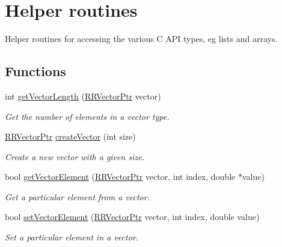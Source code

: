 \hypertarget{group__helper_routines}{\section{Helper routines}
\label{group__helper_routines}
}


Helper routines for accessing the various C A\+P\+I types, eg lists and arrays.  


\subsection*{Functions}
\begin{DoxyCompactItemize}
\item 
int \hyperlink{group__helper_routines_ga36649ac03ad15ad8242f03ff9d28b0a9}{get\+Vector\+Length} (\hyperlink{rrc__types_8h_a3be72d6006034fd349f753d2bf441bf7}{R\+R\+Vector\+Ptr} vector)
\begin{DoxyCompactList}\small\item\em Get the number of elements in a vector type. \end{DoxyCompactList}\item 
\hyperlink{rrc__types_8h_a3be72d6006034fd349f753d2bf441bf7}{R\+R\+Vector\+Ptr} \hyperlink{group__helper_routines_gac903628f96b1bf2308fa4a79b189cc1c}{create\+Vector} (int size)
\begin{DoxyCompactList}\small\item\em Create a new vector with a given size. \end{DoxyCompactList}\item 
bool \hyperlink{group__helper_routines_ga10140bb46cc906a75e575c81022a9f2a}{get\+Vector\+Element} (\hyperlink{rrc__types_8h_a3be72d6006034fd349f753d2bf441bf7}{R\+R\+Vector\+Ptr} vector, int index, double $\ast$value)
\begin{DoxyCompactList}\small\item\em Get a particular element from a vector. \end{DoxyCompactList}\item 
bool \hyperlink{group__helper_routines_gaca70bc807a455ec497b7d8e8a2affe45}{set\+Vector\+Element} (\hyperlink{rrc__types_8h_a3be72d6006034fd349f753d2bf441bf7}{R\+R\+Vector\+Ptr} vector, int index, double value)
\begin{DoxyCompactList}\small\item\em Set a particular element in a vector. \end{DoxyCompactList}\item 

\end{DoxyCompactItemize}
